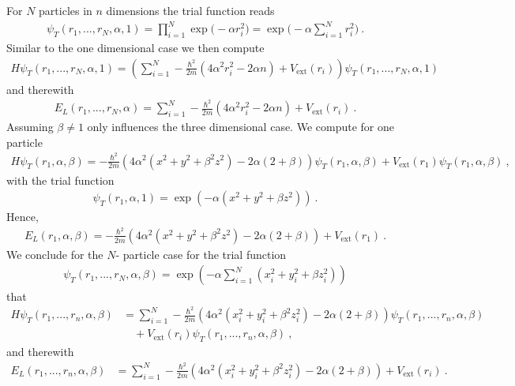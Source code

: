 \documentclass[11pt,a4paper]{article}
\numberwithin{equation}{section}
\begin{document}
For $N$ particles in $n$ dimensions the trial function reads
\begin{align*}
\psi_T(r_1,...,r_N,\alpha,1)
=
\prod_{i=1}^N\exp\big(-\alpha r_i^2\big)
=
\exp\big(-\alpha \sum_{i=1}^Nr_i^2\big)~.
\end{align*}
Similar to the one dimensional case we then compute
\begin{align*}
H\psi_T(r_1,...,r_N,\alpha,1)
=
\left(\sum_{i=1}^N-\frac{\hbar^2}{2m}\left(4\alpha^2r_i^2-2\alpha n\right)
+V_{\mathrm{ext}}(r_i)\right)\psi_T(r_1,...,r_N,\alpha,1)
\end{align*}
and therewith 
\begin{align*}
E_L(r_1,...,r_N,\alpha)
=
\sum_{i=1}^N-\frac{\hbar^2}{2m}\left(4\alpha^2r_i^2-2\alpha n\right)
+V_{\mathrm{ext}}(r_i)~.
\end{align*}
Assuming $\beta\neq 1 $ only influences the three dimensional case. 
%
We compute for one particle
\begin{align*}
H \psi_T(r_1,\alpha,\beta)
=
-\frac{\hbar^2}{2m}\left(4\alpha^2(x^2+y^2+\beta^2z^2)-2\alpha (2+\beta)\right)\psi_T(r_1,\alpha,\beta)+V_{\mathrm{ext}}(r_1)\psi_T(r_1,\alpha,\beta)~,
\end{align*}
with the trial function
\begin{align*}
\psi_T(r_1,\alpha,1) = \exp(-\alpha (x^2+y^2+\beta z^2))~.
\end{align*}
Hence,
\begin{align*}
E_{L}(r_1,\alpha,\beta)
=
-\frac{\hbar^2}{2m}\left(4\alpha^2(x^2+y^2+\beta^2z^2)-2\alpha (2+\beta)\right)+V_{\mathrm{ext}}(r_1)~.
\end{align*}
We conclude for the $N$- particle case for the trial function
\begin{align*}
\psi_T(r_1,...,r_N,\alpha,\beta) = \exp(-\alpha \sum_{i=1}^{N}(x_i^2+y_i^2+\beta z_i^2))
\end{align*}
that
\begin{align*}
H \psi_T(r_1,...,r_n,\alpha,\beta)
&=
\sum_{i=1}^N-\frac{\hbar^2}{2m}\left(4\alpha^2(x_i^2+y_i^2+\beta^2z_i^2)-2\alpha (2+\beta)\right)\psi_T(r_1,...,r_n,\alpha,\beta)\\
&\quad +V_{\mathrm{ext}}(r_i)\psi_T(r_1,...,r_n,\alpha,\beta)~,
\end{align*}
and therewith
\begin{align*}
E_L(r_1,...,r_n,\alpha,\beta)
&=
\sum_{i=1}^N-\frac{\hbar^2}{2m}\left(4\alpha^2(x_i^2+y_i^2+\beta^2z_i^2)-2\alpha (2+\beta)\right)+V_{\mathrm{ext}}(r_i)~.
\end{align*}
\end{document}
